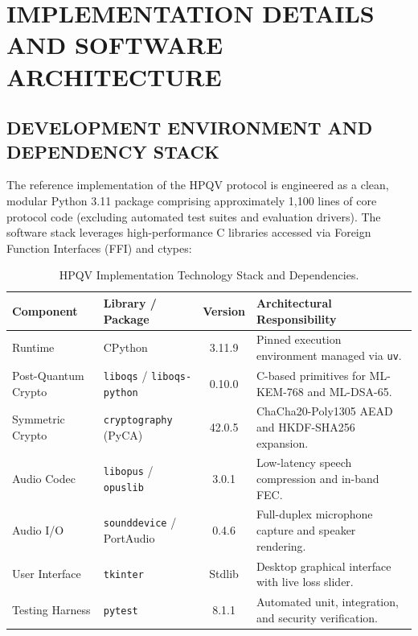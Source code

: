 \chapter{IMPLEMENTATION DETAILS AND SOFTWARE ARCHITECTURE}

\section{DEVELOPMENT ENVIRONMENT AND DEPENDENCY STACK}
The reference implementation of the HPQV protocol is engineered as a clean, modular Python 3.11 package comprising approximately 1,100 lines of core protocol code (excluding automated test suites and evaluation drivers). The software stack leverages high-performance C libraries accessed via Foreign Function Interfaces (FFI) and ctypes:

\begin{table}[htbp]
    \centering
    \caption{HPQV Implementation Technology Stack and Dependencies.}
    \label{tab:tech_stack}
    \begin{tabularx}{\textwidth}{>{\raggedright\arraybackslash}p{2.6cm} >{\raggedright\arraybackslash}p{3.2cm} c >{\raggedright\arraybackslash}X}
        \toprule
        \textbf{Component} & \textbf{Library / Package} & \textbf{Version} & \textbf{Architectural Responsibility} \\
        \midrule
        Runtime & CPython & 3.11.9 & Pinned execution environment managed via \texttt{uv}. \\
        Post-Quantum Crypto & \texttt{liboqs} / \texttt{liboqs-python} & 0.10.0 & C-based primitives for ML-KEM-768 and ML-DSA-65. \\
        Symmetric Crypto & \texttt{cryptography} (PyCA) & 42.0.5 & ChaCha20-Poly1305 AEAD and HKDF-SHA256 expansion. \\
        Audio Codec & \texttt{libopus} / \texttt{opuslib} & 3.0.1 & Low-latency speech compression and in-band FEC. \\
        Audio I/O & \texttt{sounddevice} / PortAudio & 0.4.6 & Full-duplex microphone capture and speaker rendering. \\
        User Interface & \texttt{tkinter} & Stdlib & Desktop graphical interface with live loss slider. \\
        Testing Harness & \texttt{pytest} & 8.1.1 & Automated unit, integration, and security verification. \\
        \bottomrule
    \end{tabularx}
\end{table}

